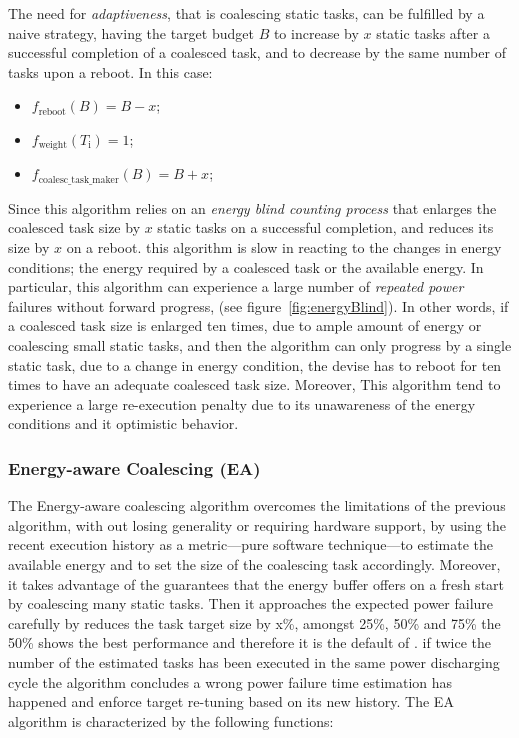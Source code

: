 The need for \emph{adaptiveness}, that is coalescing static tasks, can be fulfilled by a naive strategy, having the target budget $B$ to increase by $x$ static tasks after a successful completion of a coalesced task, and to decrease by the same number of tasks upon a reboot. In this case: 
\begin{itemize}
\item $f_\text{reboot}(B) = B - x $;
\item $f_\text{weight}(T_\text{i}) =  1$; 
\item $f_\text{coalesc\_task\_maker}(B) = B + x$; 
\end{itemize}
Since this algorithm relies on an \emph{energy blind counting process} that enlarges the coalesced task size by $x$ static tasks on a successful completion, and reduces its size by $x$ on a reboot. this algorithm is slow in reacting to the changes in energy conditions; the energy required by a coalesced task or the available energy. In particular, this algorithm can experience a large number of \emph{repeated power} failures without forward progress, (see figure~\ref{fig:energyBlind}). In other words, if a coalesced task size is enlarged ten times, due to ample amount of energy or coalescing small static tasks, and then the algorithm can only progress by a single static task, due to a change in energy condition, the devise has to reboot for ten times to have an adequate coalesced task size. Moreover, This algorithm tend to experience a large re-execution penalty due to its unawareness of the energy conditions and it optimistic behavior. 

\subsubsection{Energy-aware Coalescing (EA)}
\label{subsec:ECoalescing}
The Energy-aware coalescing algorithm overcomes the limitations of the previous algorithm, with out losing generality or requiring hardware support, by using the recent execution history as a metric---pure software technique---to estimate the available energy and to set the size of the coalescing task accordingly. Moreover, it takes advantage of the guarantees that the energy buffer offers on a fresh start by coalescing many static tasks. Then it approaches the expected power failure carefully by reduces the task target size by x\%, amongst 25\%, 50\% and 75\% the 50\% shows the best performance and therefore it is the default of \sys. if twice the number of the estimated tasks has been executed in the same power discharging cycle the algorithm concludes a wrong power failure time estimation has happened and enforce target re-tuning based on its new history. The EA algorithm is characterized by the following functions: 

